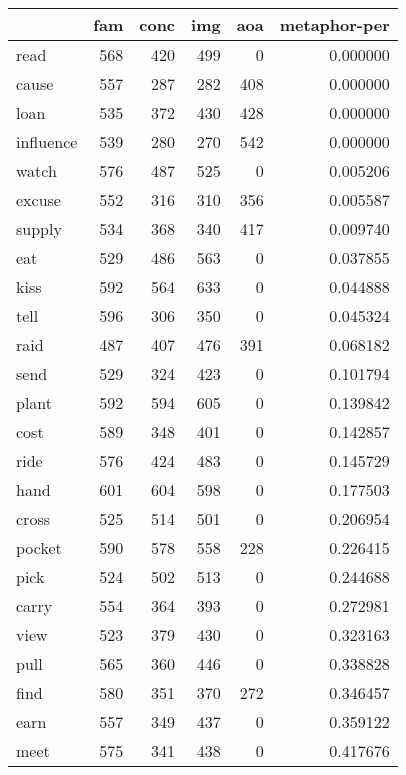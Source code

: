 \begin{tabular}{lrrrrr}
\toprule
{} &  fam &  conc &  img &  aoa &  metaphor-per \\
\midrule
read      &  568 &   420 &  499 &    0 &      0.000000 \\
cause     &  557 &   287 &  282 &  408 &      0.000000 \\
loan      &  535 &   372 &  430 &  428 &      0.000000 \\
influence &  539 &   280 &  270 &  542 &      0.000000 \\
watch     &  576 &   487 &  525 &    0 &      0.005206 \\
excuse    &  552 &   316 &  310 &  356 &      0.005587 \\
supply    &  534 &   368 &  340 &  417 &      0.009740 \\
eat       &  529 &   486 &  563 &    0 &      0.037855 \\
kiss      &  592 &   564 &  633 &    0 &      0.044888 \\
tell      &  596 &   306 &  350 &    0 &      0.045324 \\
raid      &  487 &   407 &  476 &  391 &      0.068182 \\
send      &  529 &   324 &  423 &    0 &      0.101794 \\
plant     &  592 &   594 &  605 &    0 &      0.139842 \\
cost      &  589 &   348 &  401 &    0 &      0.142857 \\
ride      &  576 &   424 &  483 &    0 &      0.145729 \\
hand      &  601 &   604 &  598 &    0 &      0.177503 \\
cross     &  525 &   514 &  501 &    0 &      0.206954 \\
pocket    &  590 &   578 &  558 &  228 &      0.226415 \\
pick      &  524 &   502 &  513 &    0 &      0.244688 \\
carry     &  554 &   364 &  393 &    0 &      0.272981 \\
view      &  523 &   379 &  430 &    0 &      0.323163 \\
pull      &  565 &   360 &  446 &    0 &      0.338828 \\
find      &  580 &   351 &  370 &  272 &      0.346457 \\
earn      &  557 &   349 &  437 &    0 &      0.359122 \\
meet      &  575 &   341 &  438 &    0 &      0.417676 \\

\end{tabular}
